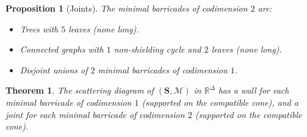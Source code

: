 \documentclass{amsart}
\newtheorem{prop}[proposition]{Proposition}
\newtheorem{thm}[proposition]{Theorem}
\theoremstyle{definition}
\theoremstyle{remark}
\numberwithin{equation}{section}
\newcommand{\0}{{\mathbf{0}}}
\newcommand{\M}{\mathcal{M}}
\renewcommand{\S}{\mathbf{S}}
\begin{document}

\begin{prop}[Joints]
The minimal barricades of codimension $2$ are:
\begin{itemize}
	\item Trees with $5$ leaves (none long).
	\item Connected graphs with $1$ non-shielding cycle and $2$ leaves (none long).
	\item Disjoint unions of $2$ minimal barricades of codimension $1$.
\end{itemize}
\end{prop}

\begin{thm}
The scattering diagram of $(\S,\M)$ in $\mathbb{R}^\Delta$ has a wall for each minimal barricade of codimension $1$ (supported on the compatible cone), and a joint for each minimal barricade of codimension $2$ (supported on the compatible cone).
\end{thm}
\end{document}
